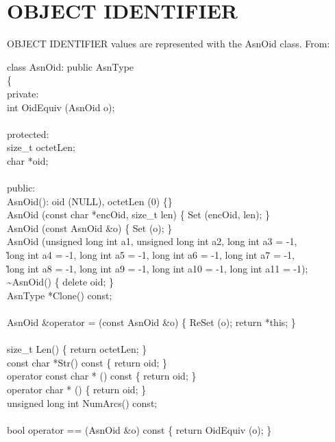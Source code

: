 \section{\label{oid-C++-section}OBJECT IDENTIFIER}
OBJECT IDENTIFIER values are represented with the {\C AsnOid} class.
From:
\begin{Ccode}
class AsnOid: public AsnType\\
\{\\
private:\\
  \>int				\>\>OidEquiv (AsnOid o);\\
\\
protected:\+\\
  size\_t			\>\>octetLen;\\
  char				\>\>*oid;\\
\\
\<public:\\
				\>\>AsnOid(): oid (NULL), octetLen (0) \{\}\\
				\>\>AsnOid (const char *encOid, size\_t len) \{ Set (encOid, len); \}\\
				\>\>AsnOid (const AsnOid \&o) \{ Set (o); \}\\
				\>\>AsnOid (unsigned long int a1, unsigned long int a2, long int a3 = -1,\\
					\`long int a4 = -1, long int a5 = -1, long int a6 = -1, long int a7 = -1,\\
					\`long int a8 = -1, long int a9 = -1, long int a10 = -1, long int a11 = -1);\\
				\>\>\~{}AsnOid() \{ delete oid; \}\\
  AsnType			\>\>*Clone() const;\\
\\
  AsnOid			\>\>\&operator = (const AsnOid \&o) \{ ReSet (o); return *this; \}\\
\\
  size\_t			\>\>Len() \{ return octetLen; \}\\
  const char			\>\>*Str() const \{ return oid; \}\\
				\>\>operator const char * () const \{ return oid; \}\\
				\>\>operator char * () \{ return oid; \}\\
  unsigned long int		\>\>NumArcs() const;\\
\\
  bool				\>\>operator == (AsnOid \&o) const \{ return OidEquiv (o); \}\\

\end{Ccode}

